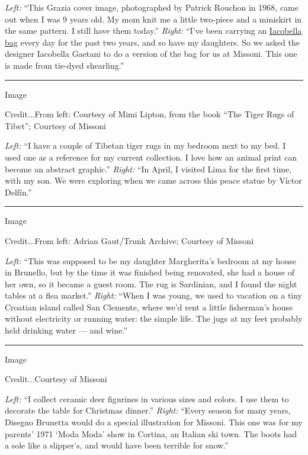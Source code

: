 \emph{Left:} ``This Grazia cover image, photographed by Patrick Rouchon
in 1968, came out when I was 9 years old. My mom knit me a little
two-piece and a miniskirt in the same pattern. I still have them
today.'' \emph{Right:} ``I've been carrying an
\href{https://www.iacobella.com/about-1/}{Iacobella bag} every day for
the past two years, and so have my daughters. So we asked the designer
Iacobella Gaetani to do a version of the bag for us at Missoni. This one
is made from tie-dyed shearling.''

\begin{center}\rule{0.5\linewidth}{\linethickness}\end{center}

Image

Credit...From left: Courtesy of Mimi Lipton, from the book ``The Tiger
Rugs of Tibet''; Courtesy of Missoni

\emph{Left:} ``I have a couple of Tibetan tiger rugs in my bedroom next
to my bed. I used one as a reference for my current collection. I love
how an animal print can become an abstract graphic.'' \emph{Right:} ``In
April, I visited Lima for the first time, with my son. We were exploring
when we came across this peace statue by Víctor Delfín.''

\begin{center}\rule{0.5\linewidth}{\linethickness}\end{center}

Image

Credit...From left: Adrian Gaut/Trunk Archive; Courtesy of Missoni

\emph{Left:} ``This was supposed to be my daughter Margherita's bedroom
at my house in Brunello, but by the time it was finished being
renovated, she had a house of her own, so it became a guest room. The
rug is Sardinian, and I found the night tables at a flea market.''
\emph{Right:} ``When I was young, we used to vacation on a tiny Croatian
island called San Clemente, where we'd rent a little fisherman's house
without electricity or running water: the simple life. The jugs at my
feet probably held drinking water --- and wine.''

\begin{center}\rule{0.5\linewidth}{\linethickness}\end{center}

Image

Credit...Courtesy of Missoni

\emph{Left:} ``I collect ceramic deer figurines in various sizes and
colors. I use them to decorate the table for Christmas dinner.''
\emph{Right:} ``Every season for many years, Disegno Brunetta would do a
special illustration for Missoni. This one was for my parents' 1971
`Moda Moda' show in Cortina, an Italian ski town. The boots had a sole
like a slipper's, and would have been terrible for snow.''

